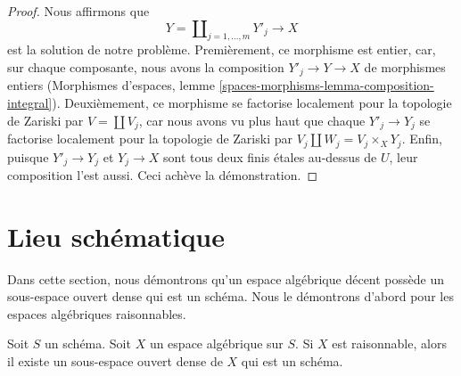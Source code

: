 \begin{proof}
\medskip\noindent
Nous affirmons que
$$
Y = \coprod\nolimits_{j = 1, \ldots, m} Y'_j \longrightarrow X
$$
est la solution de notre problème. Premièrement, ce morphisme est entier,
car, sur chaque composante, nous avons la composition $Y'_j \to Y \to X$ de
morphismes entiers (Morphismes d'espaces, lemme
\ref{spaces-morphisms-lemma-composition-integral}). Deuxièmement, ce morphisme
se factorise localement pour la topologie de Zariski par
$V = \coprod V_j$, car nous avons vu plus haut que chaque
$Y'_j \to Y_j$ se factorise localement pour la topologie de Zariski par
$V_j \amalg W_j = V_j \times_X Y_j$. Enfin, puisque $Y'_j \to Y_j$ et
$Y_j \to X$ sont tous deux finis étales au-dessus de $U$, leur composition
l'est aussi. Ceci achève la démonstration.
\end{proof}



















\section{Lieu schématique}
\label{section-schematic}

\noindent
Dans cette section, nous démontrons qu'un espace algébrique décent possède un
sous-espace ouvert dense qui est un schéma. Nous le démontrons d'abord pour
les espaces algébriques raisonnables.


\begin{proposition}
\label{proposition-reasonable-open-dense-scheme}
Soit $S$ un schéma. Soit $X$ un espace algébrique sur $S$.
Si $X$ est raisonnable, alors il existe un sous-espace ouvert dense de $X$
qui est un schéma.
\end{proposition}


